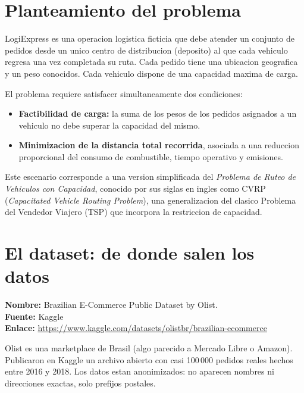 \documentclass[11pt,a4paper]{article}
\begin{document}
\tableofcontents
\newpage

\section{Planteamiento del problema}
LogiExpress es una operacion logistica ficticia que debe atender un
conjunto de pedidos desde un unico centro de distribucion (deposito) al
que cada vehiculo regresa una vez completada su ruta. Cada pedido tiene
una ubicacion geografica y un peso conocidos. Cada vehiculo dispone de
una capacidad maxima de carga.

El problema requiere satisfacer simultaneamente dos condiciones:
\begin{itemize}[leftmargin=*,nosep]
  \item \textbf{Factibilidad de carga:} la suma de los pesos de los
        pedidos asignados a un vehiculo no debe superar la capacidad
        del mismo.
  \item \textbf{Minimizacion de la distancia total recorrida}, asociada
        a una reduccion proporcional del consumo de combustible, tiempo
        operativo y emisiones.
\end{itemize}

Este escenario corresponde a una version simplificada del \emph{Problema
de Ruteo de Vehiculos con Capacidad}, conocido por sus siglas en ingles
como CVRP (\emph{Capacitated Vehicle Routing Problem}), una
generalizacion del clasico Problema del Vendedor Viajero (TSP) que
incorpora la restriccion de capacidad.

\section{El dataset: de donde salen los datos}
\textbf{Nombre:} Brazilian E-Commerce Public Dataset by Olist.\\
\textbf{Fuente:} Kaggle\\
\textbf{Enlace:} \url{https://www.kaggle.com/datasets/olistbr/brazilian-ecommerce}

Olist es una marketplace de Brasil (algo parecido a Mercado Libre o
Amazon). Publicaron en Kaggle un archivo abierto con casi 100\,000
pedidos reales hechos entre 2016 y 2018. Los datos estan anonimizados:
no aparecen nombres ni direcciones exactas, solo prefijos postales.
\end{document}
